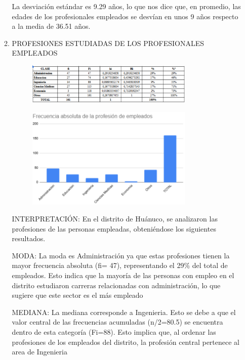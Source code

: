 \documentclass[12pt, a4paper]{article}
\begin{document}
\begin{enumerate}
\begin{enumerate}
        La desviación estándar es 9.29 años, lo que nos dice que, en promedio, las edades de los profesionales empleados se desvían en unos 9 años respecto a la media de 36.51 años.
        \item PROFESIONES ESTUDIADAS DE LOS PROFESIONALES EMPLEADOS
        \begin{figure}[H]
            \begin{center}
                \includegraphics[width=0.80\textwidth]{images/profesionesEst.png}
            \end{center}
            \label{fig:profesionesEst}
        \end{figure}
        \begin{figure}[H]
            \begin{center}
                \includegraphics[width=0.80\textwidth]{images/frecuenciaemple21.png}
            \end{center}
            \label{fig:frecuenciaemple21}
        \end{figure}
INTERPRETACIÓN:
        En el distrito de Huánuco, se analizaron las profesiones de las personas empleadas, obteniéndose los siguientes resultados.

MODA:
La moda es Administración ya que estas profesiones tienen la mayor frecuencia absoluta (fi= 47), representando el 29\% del total de empleados.
Esto indica que la mayoría de las personas con empleo en el distrito estudiaron carreras relacionadas con administración, lo que sugiere que este sector es el más empleado

MEDIANA:
La mediana  corresponde a Ingenieria. Esto se debe a que el valor central de las frecuencias acumuladas (n/2=80.5) se encuentra dentro de esta categoría (Fi=88). 
Esto implica que, al ordenar las profesiones de los empleados del distrito, la profesión central pertenece al area de Ingenieria


\end{enumerate}
\end{enumerate}
\end{document}
